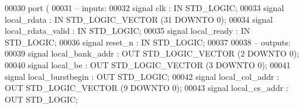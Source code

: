 \begin{DoxyCode}
00030         \textcolor{keywordflow}{port} \textcolor{vhdlchar}{(}
00031 \textcolor{keyword}{              -- inputs:}
00032                  \textcolor{keywordflow}{signal} \textcolor{vhdlchar}{clk} \textcolor{vhdlchar}{:} \textcolor{keywordflow}{IN} \textcolor{comment}{STD\_LOGIC};
00033                  \textcolor{keywordflow}{signal} \textcolor{vhdlchar}{local_rdata} \textcolor{vhdlchar}{:} \textcolor{keywordflow}{IN} \textcolor{comment}{STD\_LOGIC\_VECTOR} \textcolor{vhdlchar}{(}\textcolor{vhdllogic}{}\textcolor{vhdllogic}{31} \textcolor{keywordflow}{DOWNTO} \textcolor{vhdllogic}{}\textcolor{vhdllogic}{0}\textcolor{vhdlchar}{)};
00034                  \textcolor{keywordflow}{signal} \textcolor{vhdlchar}{local_rdata_valid} \textcolor{vhdlchar}{:} \textcolor{keywordflow}{IN} \textcolor{comment}{STD\_LOGIC};
00035                  \textcolor{keywordflow}{signal} \textcolor{vhdlchar}{local_ready} \textcolor{vhdlchar}{:} \textcolor{keywordflow}{IN} \textcolor{comment}{STD\_LOGIC};
00036                  \textcolor{keywordflow}{signal} \textcolor{vhdlchar}{reset_n} \textcolor{vhdlchar}{:} \textcolor{keywordflow}{IN} \textcolor{comment}{STD\_LOGIC};
00037 
00038 \textcolor{keyword}{              -- outputs:}
00039                  \textcolor{keywordflow}{signal} \textcolor{vhdlchar}{local_bank_addr} \textcolor{vhdlchar}{:} \textcolor{keywordflow}{OUT} \textcolor{comment}{STD\_LOGIC\_VECTOR} \textcolor{vhdlchar}{(}\textcolor{vhdllogic}{}\textcolor{vhdllogic}{2} \textcolor{keywordflow}{DOWNTO} \textcolor{vhdllogic}{}\textcolor{vhdllogic}{0}\textcolor{vhdlchar}{)};
00040                  \textcolor{keywordflow}{signal} \textcolor{vhdlchar}{local_be} \textcolor{vhdlchar}{:} \textcolor{keywordflow}{OUT} \textcolor{comment}{STD\_LOGIC\_VECTOR} \textcolor{vhdlchar}{(}\textcolor{vhdllogic}{}\textcolor{vhdllogic}{3} \textcolor{keywordflow}{DOWNTO} \textcolor{vhdllogic}{}\textcolor{vhdllogic}{0}\textcolor{vhdlchar}{)};
00041                  \textcolor{keywordflow}{signal} \textcolor{vhdlchar}{local_burstbegin} \textcolor{vhdlchar}{:} \textcolor{keywordflow}{OUT} \textcolor{comment}{STD\_LOGIC};
00042                  \textcolor{keywordflow}{signal} \textcolor{vhdlchar}{local_col_addr} \textcolor{vhdlchar}{:} \textcolor{keywordflow}{OUT} \textcolor{comment}{STD\_LOGIC\_VECTOR} \textcolor{vhdlchar}{(}\textcolor{vhdllogic}{}\textcolor{vhdllogic}{9} \textcolor{keywordflow}{DOWNTO} \textcolor{vhdllogic}{}\textcolor{vhdllogic}{0}\textcolor{vhdlchar}{)};
00043                  \textcolor{keywordflow}{signal} \textcolor{vhdlchar}{local_cs_addr} \textcolor{vhdlchar}{:} \textcolor{keywordflow}{OUT} \textcolor{comment}{STD\_LOGIC};

\end{DoxyCode}
